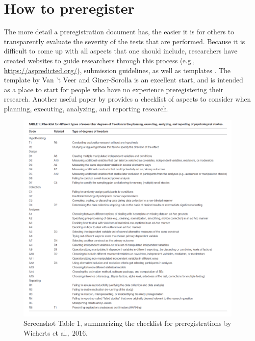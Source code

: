 \documentclass[
  oneside]{book}
\begin{document}
\hypertarget{how-to-preregister}{%
\section{How to preregister}\label{how-to-preregister}}

The more detail a preregistration document has, the easier it is for others to transparently evaluate the severity of the tests that are performed. Because it is difficult to come up with all aspects that one should include, researchers have created websites to guide researchers through this process (e.g., \url{https://aspredicted.org/}), submission guidelines, as well as templates \citep{van_t_veer_pre-registration_2016}. The template by Van 't Veer and Giner-Sorolla is an excellent start, and is intended as a place to start for people who have no experience preregistering their research. Another useful paper by \citet{wicherts_degrees_2016} provides a checklist of aspects to consider when planning, executing, analyzing, and reporting research.



\begin{figure}

{\centering \includegraphics[width=1\linewidth]{images/preregchecklist} 

}

\caption{Screenshot Table 1, summarizing the checklist for preregistrations by Wicherts et al., 2016.}\label{fig:preregcheclist}
\end{figure}
\end{document}
